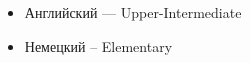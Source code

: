 \begin{itemize}
	\item Английский --- Upper-Intermediate
    \item Немецкий -- Elementary
\end{itemize}

